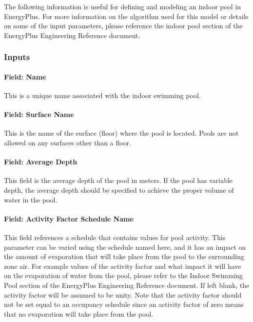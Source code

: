 The following information is useful for defining and modeling an indoor pool in EnergyPlus. For more information on the algorithm used for this model or details on some of the input parameters, please reference the indoor pool section of the EnergyPlus Engineering Reference document.

\subsubsection{Inputs}\label{inputs-7-012}

\paragraph{Field: Name}\label{field-name-7-008}

This is a unique name associated with the indoor swimming pool.

\paragraph{Field: Surface Name}\label{field-surface-name-1-000}

This is the name of the surface (floor) where the pool is located. Pools are not allowed on any surfaces other than a floor.

\paragraph{Field: Average Depth}\label{field-average-depth}

This field is the average depth of the pool in meters. If the pool has variable depth, the average depth should be specified to achieve the proper volume of water in the pool.

\paragraph{Field: Activity Factor Schedule Name}\label{field-activity-factor-schedule-name}

This field references a schedule that contains values for pool activity. This parameter can be varied using the schedule named here, and it has an impact on the amount of evaporation that will take place from the pool to the surrounding zone air. For example values of the activity factor and what impact it will have on the evaporation of water from the pool, please refer to the Indoor Swimming Pool section of the EnergyPlus Engineering Reference document. If left blank, the activity factor will be assumed to be unity. Note that the activity factor should not be set equal to an occupancy schedule since an activity factor of zero means that no evaporation will take place from the pool.

